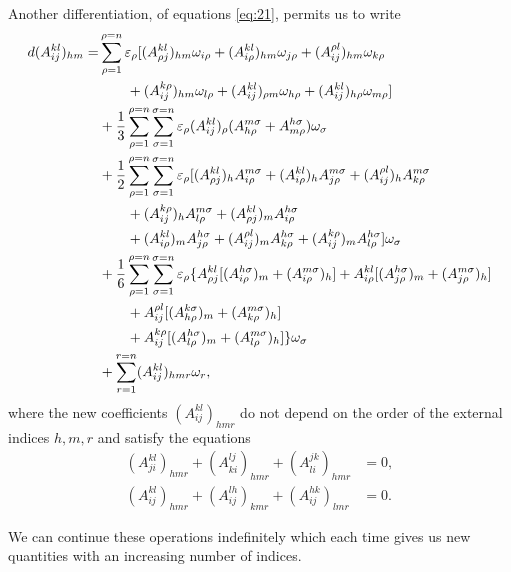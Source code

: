 \documentclass[leqno,12pt]{article}
\makeatletter
\let\old@epsilon\epsilon
\let\old@varepsilon\varepsilon
\let\epsilon\old@varepsilon
\let\varepsilon\old@epsilon
\theoremstyle{shape1}
\theoremstyle{shape0}
\theoremstyle{shape2}
\theoremstyle{definition}
\makeatother
\begin{document}
Another differentiation, of equations \eqref{eq:21}, permits us to write
\begin{align}
  \label{eq:24}
  d(A^{kl}_{ij})_{hm}=&{}\sum_{\rho=1}^{\rho=n}\epsilon_{\rho}[(A^{kl}_{\rho j})_{hm}\omega_{i\rho}+(A^{kl}_{i\rho})_{hm}\omega_{j\rho}+(A^{\rho l}_{ij})_{hm}\omega_{k\rho}\\
  \notag&{}\qquad + (A^{k\rho}_{ij})_{hm}\omega_{l\rho}+(A^{kl}_{ij})_{\rho m}\omega_{h\rho}+(A^{kl}_{ij})_{h\rho}\omega_{m\rho}]\\
  \notag&{}+\frac{1}{3}\sum_{\rho=1}^{\rho=n}\sum_{\sigma=1}^{\sigma=n}\epsilon_{\rho}(A^{kl}_{ij})_{\rho}(A^{m\sigma}_{h\rho}+A^{h\sigma}_{m\rho})\omega_{\sigma}\\
  \notag&{}+\frac{1}{2}\sum_{\rho=1}^{\rho=n}\sum_{\sigma=1}^{\sigma=n}\epsilon_{\rho}[(A^{kl}_{\rho j})_{h}A^{m\sigma}_{i\rho}+(A^{kl}_{i\rho})_{h}A^{m\sigma}_{j\rho}+(A^{\rho l}_{ij})_{h}A^{m\sigma}_{k\rho}\\
  \notag&{}\qquad + (A^{k\rho}_{ij})_{h}A^{m\sigma}_{l\rho}+(A^{kl}_{\rho j})_{m}A^{h\sigma}_{i\rho}\\
  \notag&{}\qquad + (A^{kl}_{i\rho})_{m}A^{h\sigma}_{j\rho}+(A^{\rho l}_{ij})_{m}A^{h\sigma}_{k\rho}+(A^{k\rho}_{ij})_{m}A^{h\sigma}_{l\rho}]\omega_{\sigma}\\
  \notag&{}+\frac{1}{6}\sum_{\rho=1}^{\rho=n}\sum_{\sigma=1}^{\sigma=n}\epsilon_{\rho}\{A^{kl}_{\rho j}[(A^{h\sigma}_{i\rho})_{m}+(A^{m\sigma}_{i\rho})_{h}]+A^{kl}_{i\rho}[(A^{h\sigma}_{j\rho})_{m}+(A^{m\sigma}_{j\rho})_{h}]\\
  \notag&{}\qquad + A^{\rho l}_{ij}[(A^{k\sigma}_{h\rho})_{m}+(A^{m\sigma}_{k\rho})_{h}]\\
  \notag&{}\qquad + A^{k\rho}_{ij}[(A^{h\sigma}_{l\rho})_{m}+(A^{m\sigma}_{l\rho})_{h}]\}\omega_{\sigma}\\
  \notag&{}+\sum_{r=1}^{r=n}(A^{kl}_{ij})_{hmr}\omega_{r},
\end{align}
where the new coefficients $(A^{kl}_{ij})_{hmr}$ do not depend on the order of the external indices $h,m,r$ and satisfy the equations
\begin{align}
  \label{eq:25}
  (A^{kl}_{ji})_{hmr}+(A^{lj}_{ki})_{hmr}+(A^{jk}_{li})_{hmr}&=0,\\
  \label{eq:26}
  (A^{kl}_{ij})_{hmr}+(A^{lh}_{ij})_{kmr}+(A^{hk}_{ij})_{lmr}&=0.
\end{align}

We can continue these operations indefinitely which each time gives us new quantities with an increasing number of indices.
\end{document}

